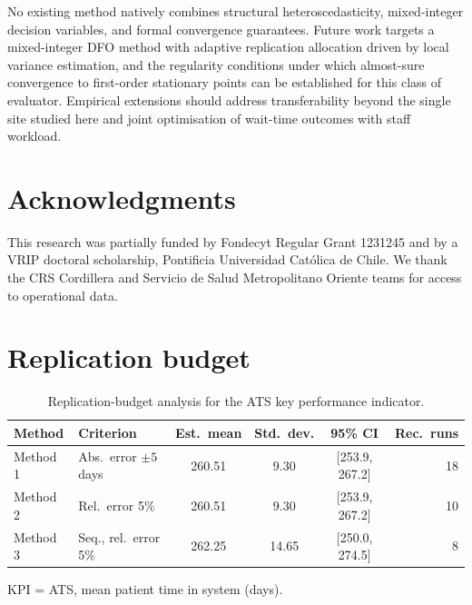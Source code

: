 \documentclass[11pt]{elsarticle}
\begin{document}
No existing method natively combines structural heteroscedasticity, mixed-integer decision variables, and formal convergence guarantees. Future work targets a mixed-integer DFO method with adaptive replication allocation driven by local variance estimation, and the regularity conditions under which almost-sure convergence to first-order stationary points can be established for this class of evaluator. Empirical extensions should address transferability beyond the single site studied here and joint optimisation of wait-time outcomes with staff workload.


\section*{Acknowledgments}
This research was partially funded by Fondecyt Regular Grant 1231245 and by a VRIP doctoral scholarship, Pontificia Universidad Cat\'olica de Chile. We thank the CRS Cordillera and Servicio de Salud Metropolitano Oriente teams for access to operational data.


\appendix

\section{Replication budget}
\label{app:replication}
\begin{table}[H]
\centering
\caption{Replication-budget analysis for the ATS key performance indicator.}
\begin{threeparttable}
\begin{tabular}{@{}llcccr@{}}
\toprule
Method & Criterion & Est.\ mean & Std.\ dev. & 95\% CI & Rec.\ runs \\
\midrule
Method 1 & Abs.\ error $\pm5$ days & 260.51 & 9.30 & [253.9, 267.2] & 18 \\
Method 2 & Rel.\ error 5\%         & 260.51 & 9.30 & [253.9, 267.2] & 10 \\
Method 3 & Seq., rel.\ error 5\%   & 262.25 & 14.65 & [250.0, 274.5] &  8 \\
\bottomrule
\end{tabular}
\begin{tablenotes}
\footnotesize
\item KPI = ATS, mean patient time in system (days).
\end{tablenotes}
\end{threeparttable}
\end{table}
\end{document}
